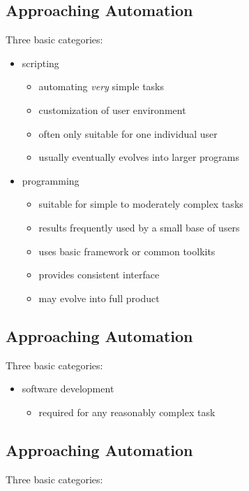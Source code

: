 \documentclass[xga]{xdvislides}
\begin{document}
\subsection{Approaching Automation}
Three basic categories:
\\

\begin{itemize}
	\item scripting
		\begin{itemize}
			\item automating {\em very} simple tasks
			\item customization of user environment
			\item often only suitable for one individual user
			\item usually eventually evolves into larger programs
		\end{itemize}
	\item programming
		\begin{itemize}
			\item suitable for simple to moderately complex tasks
			\item results frequently used by a small base of users
			\item uses basic framework or common toolkits
			\item provides consistent interface
			\item may evolve into full product
		\end{itemize}
\end{itemize}


\subsection{Approaching Automation}
Three basic categories:
\\

\begin{itemize}
	\item software development
		\begin{itemize}
			\item required for any reasonably complex task
		\end{itemize}
\end{itemize}

\subsection{Approaching Automation}
Three basic categories:
\\
\end{document}
